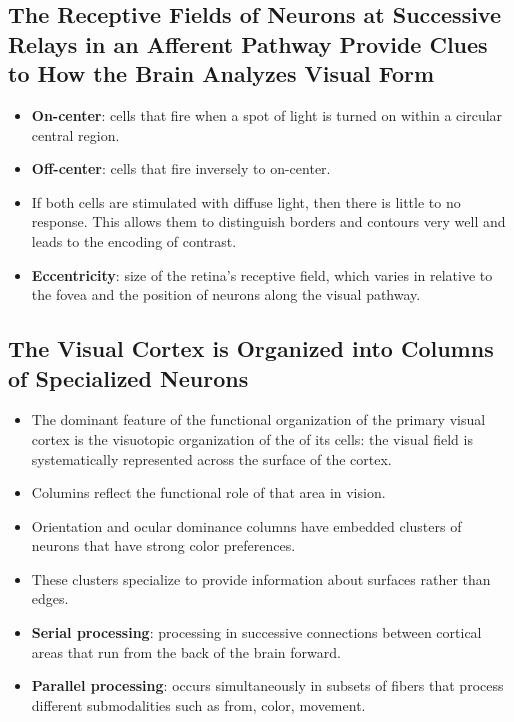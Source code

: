 \documentclass[12pt,a4paper]{article}
\begin{document}
\subsection{The Receptive Fields of Neurons at Successive Relays in an Afferent Pathway Provide Clues to How the Brain Analyzes Visual Form}
\begin{itemize}
    \item \textbf{On-center}: cells that fire when a spot of light is turned on within a circular central region.
    \item \textbf{Off-center}: cells that fire inversely to on-center.
    \item If both cells are stimulated with diffuse light, then there is little to no response. This allows them to distinguish borders and contours very well and leads to the encoding of contrast.
    \item \textbf{Eccentricity}: size of the retina's receptive field, which varies in relative to the fovea and the position of neurons along the visual pathway.
\end{itemize}

\subsection{The Visual Cortex is Organized into Columns of Specialized Neurons}
\begin{itemize}
    \item The dominant feature of the functional organization of the primary visual cortex is the visuotopic organization of the of its cells: the visual field is systematically represented across the surface of the cortex.
    \item Columins reflect the functional role of that area in vision.
    \item Orientation and ocular dominance columns have embedded clusters of neurons that have strong color preferences.
    \item These clusters specialize to provide information about surfaces rather than edges.
    \item \textbf{Serial processing}: processing in successive connections between cortical areas that run from the back of the brain forward.
    \item \textbf{Parallel processing}: occurs simultaneously in subsets of fibers that process different submodalities such as from, color, movement.
\end{itemize}
\end{document}
